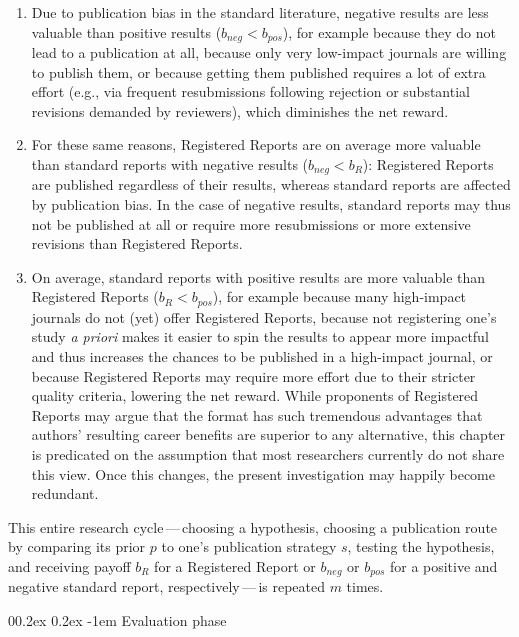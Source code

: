 \documentclass[
  british,
  a4paper,
  ,man,mask,floatsintext]{apa6}
\makeatletter
\let\oldparagraph\paragraph
\renewcommand{\paragraph}{
    \@ifstar
      \xxxParagraphStar
      \xxxParagraphNoStar
  }
\newcommand{\xxxParagraphStar}[1]{\oldparagraph*{#1}\mbox{}}
\newcommand{\xxxParagraphNoStar}[1]{\oldparagraph{#1}\mbox{}}
\providecommand{\tightlist}{%
  \setlength{\itemsep}{0pt}\setlength{\parskip}{0pt}}
\renewcommand{\paragraph}{\@startsection{paragraph}{4}{\parindent}%
  {0\baselineskip \@plus 0.2ex \@minus 0.2ex}%
  {-1em}%
  {\normalfont\normalsize\bfseries\itshape\typesectitle}}
\makeatother
\begin{document}
\begin{enumerate}
\def\labelenumi{\arabic{enumi}.}
\tightlist
\item
  Due to publication bias in the standard literature, negative results are less valuable than positive results (\(b_{neg} < b_{pos}\)), for example because they do not lead to a publication at all, because only very low-impact journals are willing to publish them, or because getting them published requires a lot of extra effort (e.g., via frequent resubmissions following rejection or substantial revisions demanded by reviewers), which diminishes the net reward.
\item
  For these same reasons, Registered Reports are on average more valuable than standard reports with negative results (\(b_{neg} < b_{R}\)): Registered Reports are published regardless of their results, whereas standard reports are affected by publication bias.
  In the case of negative results, standard reports may thus not be published at all or require more resubmissions or more extensive revisions than Registered Reports.
\item
  On average, standard reports with positive results are more valuable than Registered Reports (\(b_{R} < b_{pos}\)), for example because many high-impact journals do not (yet) offer Registered Reports, because not registering one's study \emph{a priori} makes it easier to spin the results to appear more impactful and thus increases the chances to be published in a high-impact journal, or because Registered Reports may require more effort due to their stricter quality criteria, lowering the net reward.
  While proponents of Registered Reports may argue that the format has such tremendous advantages that authors' resulting career benefits are superior to any alternative, this chapter is predicated on the assumption that most researchers currently do not share this view.
  Once this changes, the present investigation may happily become redundant.
\end{enumerate}

This entire research cycle\(\,\)---\(\,\)choosing a hypothesis, choosing a publication route by comparing its prior \(p\) to one's publication strategy \(s\), testing the hypothesis, and receiving payoff \(b_{R}\) for a Registered Report or \(b_{neg}\) or \(b_{pos}\) for a positive and negative standard report, respectively\(\,\)---\(\,\)is repeated \(m\) times.

\paragraph{Evaluation phase}\label{evaluation-phase}
\end{document}
